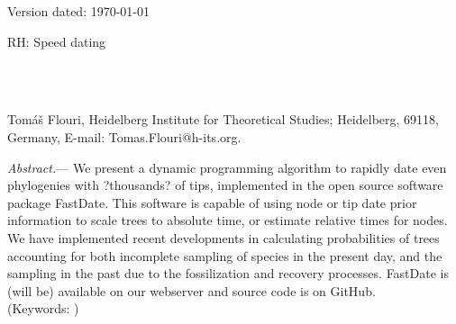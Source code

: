 \documentclass{llncs}
\newcommand{\ejmcomment}[1]{{\color{green} #1}}
\renewcommand{\subsubsection}[1]{%
\vspace{2ex}
\noindent
\textit{#1.}---}
\begin{document}
\begin{flushright}
Version dated: \today
\end{flushright}
\bigskip
\noindent RH: Speed dating


\bigskip
\medskip
\begin{center}

\bigskip




\\
\\
\end{center}
\medskip
{} Tom\'{a}\v{s} Flouri, 
Heidelberg Institute for Theoretical Studies; Heidelberg, 69118, Germany, E-mail: Tomas.Flouri@h-its.org.\\


\vspace{1in}

\subsubsection{Abstract} We present a dynamic programming algorithm to rapidly
date even phylogenies with \ejmcomment{?thousands?} of tips, implemented in the open source software package FastDate. 
This software is capable of using node or tip date prior information to scale trees to absolute time,
or estimate relative times for nodes.
We have implemented recent developments in calculating probabilities of trees accounting for both incomplete 
sampling of species in the present day, and the sampling in the past due to the fossilization and recovery processes.
FastDate is \ejmcomment{(will be)} available on our webserver and source code is on GitHub.\\
\noindent (Keywords: )\\
\end{document}
